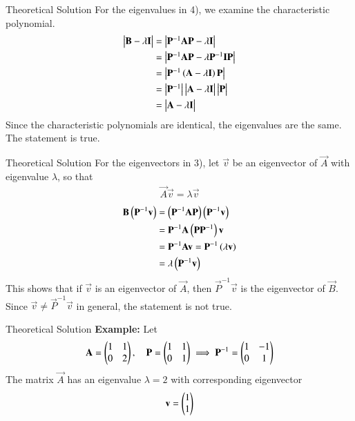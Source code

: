 \documentclass{beamer}
\begin{document}
\begin{frame}{Theoretical Solution}
For the eigenvalues in 4), we examine the characteristic polynomial.
\begin{align}
    \begin{vmatrix}\mathbf{B} - \lambda\mathbf{I}\end{vmatrix} &= \begin{vmatrix}\mathbf{P}^{-1}\mathbf{A}\mathbf{P} - \lambda\mathbf{I}\end{vmatrix} \\
    &= \begin{vmatrix}\mathbf{P}^{-1}\mathbf{A}\mathbf{P} - \lambda\mathbf{P}^{-1}\mathbf{I}\mathbf{P}\end{vmatrix} \\
    &= \begin{vmatrix}\mathbf{P}^{-1}\left(\mathbf{A} - \lambda\mathbf{I}\right)\mathbf{P}\end{vmatrix} \\
    &= \begin{vmatrix}\mathbf{P}^{-1}\end{vmatrix}\begin{vmatrix}\mathbf{A} - \lambda\mathbf{I}\end{vmatrix}\begin{vmatrix}\mathbf{P}\end{vmatrix} \\
    &= \begin{vmatrix}\mathbf{A} - \lambda\mathbf{I}\end{vmatrix}
\end{align}
Since the characteristic polynomials are identical, the eigenvalues are the same. The statement is true.
\end{frame}

\begin{frame}{Theoretical Solution}
For the eigenvectors in 3), let $\vec{v}$ be an eigenvector of $\vec{A}$ with eigenvalue $\lambda$, so that
\begin{align}
    \vec{A}\vec{v} = \lambda\vec{v}
\end{align}
\begin{align}
    \mathbf{B}\left(\mathbf{P}^{-1}\mathbf{v}\right) &= \left(\mathbf{P}^{-1}\mathbf{A}\mathbf{P}\right)\left(\mathbf{P}^{-1}\mathbf{v}\right) \\
    &= \mathbf{P}^{-1}\mathbf{A}\left(\mathbf{P}\mathbf{P}^{-1}\right)\mathbf{v} \\
    &= \mathbf{P}^{-1}\mathbf{A}\mathbf{v} = \mathbf{P}^{-1}\left(\lambda\mathbf{v}\right) \\
    &= \lambda\left(\mathbf{P}^{-1}\mathbf{v}\right)
\end{align}
This shows that if $\vec{v}$ is an eigenvector of $\vec{A}$, then $\vec{P}^{-1}\vec{v}$ is the eigenvector of $\vec{B}$. Since $\vec{v} \neq \vec{P}^{-1}\vec{v}$ in general, the statement is not true.
\end{frame}

\begin{frame}{Theoretical Solution}
\textbf{Example:} Let
\begin{align}
    \mathbf{A} = \begin{pmatrix}1 & 1 \\ 0 & 2\end{pmatrix}, \quad \mathbf{P} = \begin{pmatrix}1 & 1 \\ 0 & 1\end{pmatrix} \implies \mathbf{P}^{-1} = \begin{pmatrix}1 & -1 \\ 0 & 1\end{pmatrix}
\end{align}
The matrix $\vec{A}$ has an eigenvalue $\lambda=2$ with corresponding eigenvector 
\begin{align}
	\mathbf{v} = \begin{pmatrix}1 \\ 1\end{pmatrix}
\end{align}
\end{frame}
\end{document}
